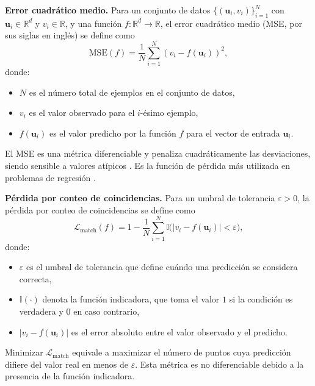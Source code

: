 \documentclass[12pt,a4paper]{article}
\newcommand{\R}{\mathbb{R}}
\newcommand{\loss}{\mathcal{L}}
\begin{document}
\textbf{Error cuadrático medio.} Para un conjunto de datos \(\{(\mathbf{u}_i, v_i)\}_{i=1}^{N}\) con \(\mathbf{u}_i \in \R^d\) y \(v_i \in \R\), y una función \(f: \R^d \to \R\), el error cuadrático medio (MSE, por sus siglas en inglés) se define como
\begin{equation}
    \text{MSE}(f) = \frac{1}{N} \sum_{i=1}^{N} \left( v_i - f(\mathbf{u}_i) \right)^2,
\end{equation}
donde:
\begin{itemize}
    \item \(N\) es el número total de ejemplos en el conjunto de datos,
    \item \(v_i\) es el valor observado para el \(i\)-ésimo ejemplo,
    \item \(f(\mathbf{u}_i)\) es el valor predicho por la función \(f\) para el vector de entrada \(\mathbf{u}_i\).
\end{itemize}
El MSE es una métrica diferenciable y penaliza cuadráticamente las desviaciones, siendo sensible a valores atípicos \cite{hastie2009elements}. Es la función de pérdida más utilizada en problemas de regresión \cite{bishop2006pattern}.

\textbf{Pérdida por conteo de coincidencias.} Para un umbral de tolerancia \(\varepsilon > 0\), la pérdida por conteo de coincidencias se define como
\begin{equation}
    \loss_{\text{match}}(f) = 1 - \frac{1}{N} \sum_{i=1}^{N} \mathbb{I}\bigl( |v_i - f(\mathbf{u}_i)| < \varepsilon \bigr),
\end{equation}
donde:
\begin{itemize}
    \item \(\varepsilon\) es el umbral de tolerancia que define cuándo una predicción se considera correcta,
    \item \(\mathbb{I}(\cdot)\) denota la función indicadora, que toma el valor \(1\) si la condición es verdadera y \(0\) en caso contrario,
    \item \(|v_i - f(\mathbf{u}_i)|\) es el error absoluto entre el valor observado y el predicho.
\end{itemize}
Minimizar \(\loss_{\text{match}}\) equivale a maximizar el número de puntos cuya predicción difiere del valor real en menos de \(\varepsilon\). Esta métrica es no diferenciable debido a la presencia de la función indicadora.
\end{document}
